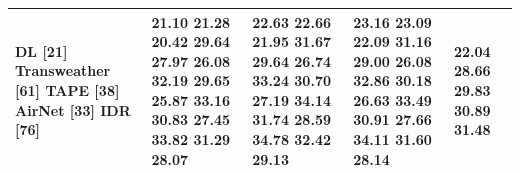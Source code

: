 \begin{tabular}{lllll}
\toprule
DL [21] Transweather [61] TAPE [38] AirNet [33] IDR [76] & 21.10 21.28 20.42 29.64 27.97 26.08 32.19 29.65 25.87 33.16 30.83 27.45 33.82 31.29 28.07 & 22.63 22.66 21.95 31.67 29.64 26.74 33.24 30.70 27.19 34.14 31.74 28.59 34.78 32.42 29.13 & 23.16 23.09 22.09 31.16 29.00 26.08 32.86 30.18 26.63 33.49 30.91 27.66 34.11 31.60 28.14 & 22.04 28.66 29.83 30.89 31.48 \\
\midrule
\bottomrule
\end{tabular}
